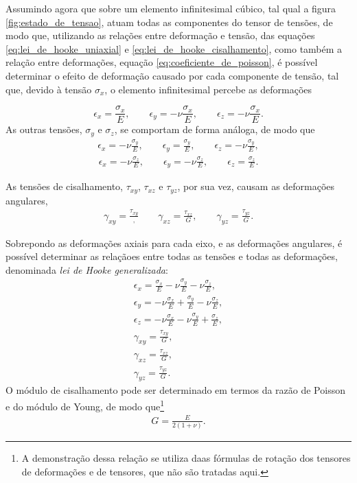 Assumindo agora que sobre um elemento infinitesimal cúbico, tal qual a figura \ref{fig:estado_de_tensao}, atuam todas as componentes do tensor de tensões, de modo que, utilizando as relações entre deformação e tensão, das equações \ref{eq:lei_de_hooke_uniaxial} e \ref{eq:lei_de_hooke_cisalhamento}, como também a relação entre deformações, equação \ref{eq:coeficiente_de_poisson}, é possível determinar o efeito de deformação causado por cada componente de tensão, tal que, devido à tensão $\sigma_x$, o elemento infinitesimal percebe as deformações

\begin{equation}
    \epsilon_x =\frac{\sigma_x}{E}, \qquad \epsilon_y = -\nu \frac{\sigma_x}{E}, \qquad \epsilon_z = -\nu \frac{\sigma_x}{E}.
\end{equation}
As outras tensões, $\sigma_y$ e $\sigma_z$, se comportam de forma análoga, de modo que
\begin{gather}
    \epsilon_x =-\nu \frac{\sigma_y}{E}, \qquad \epsilon_y = \frac{\sigma_y}{E}, \qquad \epsilon_z = -\nu \frac{\sigma_y}{E}, 
\end{gather}
\begin{gather}
    \epsilon_x =-\nu \frac{\sigma_z}{E}, \qquad \epsilon_y = -\nu \frac{\sigma_z}{E}, \qquad \epsilon_z = \frac{\sigma_z}{E}.
\end{gather}

As tensões de cisalhamento, $\tau_{xy}$, $\tau_{xz}$ e $\tau_{yz}$, por sua vez, causam as deformações angulares,
\begin{gather}
    \gamma_{xy} = \frac{\tau_{xy}}, \qquad \gamma_{xz} = \frac{\tau_{xz}}{G}, \qquad \gamma_{yz} = \frac{\tau_{yz}}{G}.
\end{gather}

Sobrepondo as deformações axiais para cada eixo, e as deformações angulares, é possível determinar as relaçãoes entre todas as tensões e todas as deformações, denominada \emph{lei de Hooke generalizada}:
\begin{gather}
    \epsilon_x = \frac{\sigma_x}{E} - \nu \frac{\sigma_y}{E} - \nu \frac{\sigma_z}{E}, \\
    \epsilon_y = -\nu \frac{\sigma_x}{E} + \frac{\sigma_y}{E} - \nu \frac{\sigma_z}{E}, \\
    \epsilon_z = -\nu \frac{\sigma_x}{E} - \nu \frac{\sigma_y}{E} + \frac{\sigma_z}{E}, \\
    \gamma_{xy} = \frac{\tau_{xy}}{G}, \\ 
    \gamma_{xz} = \frac{\tau_{xz}}{G}, \\
    \gamma_{yz} = \frac{\tau_{yz}}{G}.
    \label{eq:lei_de_hooke_generalizada}
\end{gather}
O módulo de cisalhamento pode ser determinado em termos da razão de Poisson e do módulo de Young, de modo que\footnote{A demonstração dessa relação se utiliza daas fórmulas de rotação dos tensores de deformações e de tensores, que não são tratadas aqui.}
\begin{gather}
    G = \frac{E}{2(1+\nu)}.
\end{gather}

